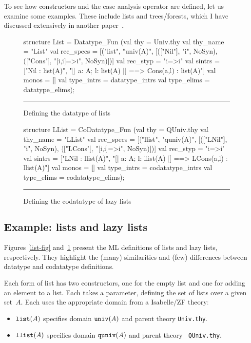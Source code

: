 To see how constructors and the case analysis operator are defined, let us
examine some examples.  These include lists and trees/forests, which I have
discussed extensively in another paper~\cite{paulson-set-II}.

\begin{figure}
\begin{ttbox} 
structure List = Datatype_Fun
 (val thy        = Univ.thy
  val thy_name   = "List"
  val rec_specs  = [("list", "univ(A)",
                      [(["Nil"],    "i",        NoSyn), 
                       (["Cons"],   "[i,i]=>i", NoSyn)])]
  val rec_styp   = "i=>i"
  val sintrs     = ["Nil : list(A)",
                    "[| a: A;  l: list(A) |] ==> Cons(a,l) : list(A)"]
  val monos      = []
  val type_intrs = datatype_intrs
  val type_elims = datatype_elims);
\end{ttbox}
\hrule
\caption{Defining the datatype of lists} \label{list-fig}

\medskip
\begin{ttbox}
structure LList = CoDatatype_Fun
 (val thy        = QUniv.thy
  val thy_name   = "LList"
  val rec_specs  = [("llist", "quniv(A)",
                      [(["LNil"],   "i",        NoSyn), 
                       (["LCons"],  "[i,i]=>i", NoSyn)])]
  val rec_styp   = "i=>i"
  val sintrs     = ["LNil : llist(A)",
                    "[| a: A;  l: llist(A) |] ==> LCons(a,l) : llist(A)"]
  val monos      = []
  val type_intrs = codatatype_intrs
  val type_elims = codatatype_elims);
\end{ttbox}
\hrule
\caption{Defining the codatatype of lazy lists} \label{llist-fig}
\end{figure}

\subsection{Example: lists and lazy lists}
Figures \ref{list-fig} and~\ref{llist-fig} present the ML definitions of
lists and lazy lists, respectively.  They highlight the (many) similarities
and (few) differences between datatype and codatatype definitions.

Each form of list has two constructors, one for the empty list and one for
adding an element to a list.  Each takes a parameter, defining the set of
lists over a given set~$A$.  Each uses the appropriate domain from a
Isabelle/ZF theory:
\begin{itemize}
\item $\hbox{\tt list}(A)$ specifies domain $\hbox{\tt univ}(A)$ and parent theory {\tt Univ.thy}.

\item $\hbox{\tt llist}(A)$ specifies domain $\hbox{\tt quniv}(A)$ and parent theory {\tt
QUniv.thy}.
\end{itemize}

